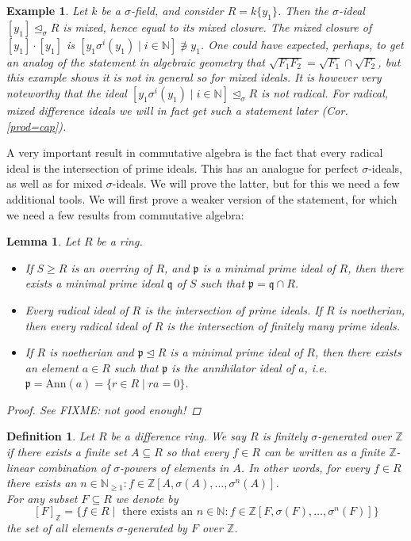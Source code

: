 \documentclass{article}
\def\NE{\mathbb{N}_{\geq1}}
\def\N{\mathbb{N}}
\def\Z{\mathbb{Z}}
\def\p{\mathfrak{p}}
\def\q{\mathfrak{q}}
\def\s{\sigma}
\def\si{\unlhd_{\sigma}}
\newenvironment{bew}{\begin{proof}[Proof]}{\end{proof}}
\theoremstyle{plain}
\newtheorem{ex}[Satz]{Example}
\newtheorem{lem}[Satz]{Lemma}
\newtheorem{defn}[Satz]{Definition}
\theoremstyle{definition}
\begin{document}
\begin{ex} %
Let $k$ be a $\s$-field, and consider $R = k\{y_1\}$. Then the $\s$-ideal $[y_1] \si R$ is mixed, hence equal to its mixed closure.
The mixed closure of $[y_1] \cdot [y_1]$ is $[ y_1 \s^i(y_1) \mid i \in \N ] \not \ni y_1$.
One could have expected, perhaps, to get an analog of the statement in algebraic geometry that $\sqrt{F_1  F_2 } = \sqrt{F_1} \cap \sqrt{F_2}$, but this example shows it is not in general so for mixed ideals.
It is however very noteworthy that the ideal $[ y_1 \s^i(y_1) \mid i \in \N ] \si R$ is not radical. For radical, mixed difference ideals we will in fact get such a statement later (Cor. \ref{prod=cap}).
\end{ex}

A very important result in commutative algebra is the fact that every radical ideal is the intersection of prime ideals. This has an analogue for perfect $\s$-ideals, as well as for mixed $\s$-ideals. 
We will prove the latter, but for this we need a few additional tools. We will first prove a weaker version of the statement, for which we need a few results from commutative algebra:

\begin{lem}\label{commalg}
Let $R$ be a ring. 
\begin{itemize}
\item If $S \geq R$ is an overring of $R$, and $\p$ is a minimal prime ideal of $R$, then there exists a minimal prime ideal $\q$ of $S$ such that $\p = \q \cap R$.
\item Every radical ideal of $R$ is the intersection of prime ideals. If $R$ is noetherian, then every radical ideal of $R$ is the intersection of finitely many prime ideals.
\item If $R$ is noetherian and $\p \unlhd R$ is a minimal prime ideal of $R$, then there exists an element $a \in R$ such that $\p$ is the annihilator ideal of $a$, i.e. $\p = \text{Ann}(a) = \{ r \in R \mid ra = 0 \}$.
\end{itemize}
\begin{bew}
See \cite{wibmer} FIXME: not good enough!
\end{bew}
\end{lem}

\begin{defn}
Let $R$ be a difference ring. We say $R$ is \emph{finitely $\s$-generated over $\Z$} if there exists a finite set $A \subseteq R$ so that every $f \in R$ can be written as a finite $\Z$-linear combination of $\s$-powers of elements in $A$. In other words,
for every $f \in R$ there exists an $n \in \NE: f \in \Z[A,\sigma(A),\ldots,\s^n(A)]$. \\ 
\indent For any subset $F \subseteq R$ we denote by $$[F]_{\Z} = \{ f \in R \mid \text{ there exists an } n \in \N: f \in \Z[F, \s(F), \ldots, \s^n(F)] \}$$ the set of all elements $\s$-generated by $F$ over $\Z$.
\end{defn}\index{finitely $\s$-generated over $\Z$}
\end{document}
